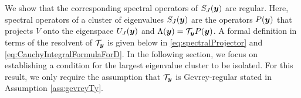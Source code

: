  We show that the corresponding spectral operators of $S_J({\boldsymbol{y}})$ are regular.
 Here, spectral operators of a cluster of eigenvalues $S_J({\boldsymbol{y}})$ are the operators $P({\boldsymbol{y}}) $ that projects $V $ onto the eigenspace $U_J({\boldsymbol{y}}) $ and $\Lambda({\boldsymbol{y}}) = \mathcal{T}_{{\boldsymbol{y}}} P({\boldsymbol{y}}) $.  A formal definition in terms of the resolvent of $\mathcal{T}_{{\boldsymbol{y}}}$ is given below in \eqref{eq:spectralProjector} and \eqref{eq:CauchyIntegralFormulaForD}.
 In the following section, we focus on establishing a condition for the largest eigenvalue cluster to be isolated.   For this result, we only require the assumption that $\mathcal{T}_{\boldsymbol{y}}$ is Gevrey-regular stated in Assumption \ref{ass:gevreyTy}.
 


